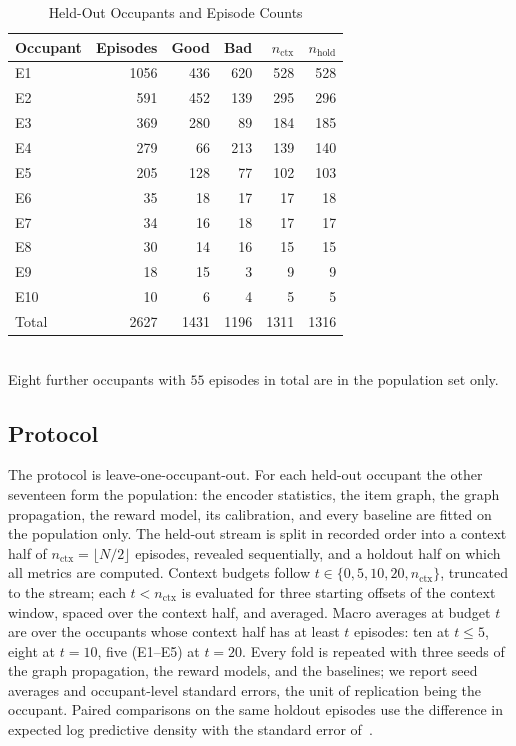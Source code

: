 \documentclass[conference]{IEEEtran}
\begin{document}
\begin{table}[t]
\caption{Held-Out Occupants and Episode Counts}
\label{tab:data}
\centering
\setlength{\tabcolsep}{5pt}
\begin{tabular}{lrrrrr}
\toprule
Occupant & Episodes & Good & Bad & $n_{\mathrm{ctx}}$ & $n_{\mathrm{hold}}$ \\
\midrule
E1  & 1056 & 436 & 620 & 528 & 528 \\
E2  &  591 & 452 & 139 & 295 & 296 \\
E3  &  369 & 280 &  89 & 184 & 185 \\
E4  &  279 &  66 & 213 & 139 & 140 \\
E5  &  205 & 128 &  77 & 102 & 103 \\
E6  &   35 &  18 &  17 &  17 &  18 \\
E7  &   34 &  16 &  18 &  17 &  17 \\
E8  &   30 &  14 &  16 &  15 &  15 \\
E9  &   18 &  15 &   3 &   9 &   9 \\
E10 &   10 &   6 &   4 &   5 &   5 \\
\midrule
Total & 2627 & 1431 & 1196 & 1311 & 1316 \\
\bottomrule
\end{tabular}
\\[2pt]
{\footnotesize Eight further occupants with $55$ episodes in total are in the population set only.}
\end{table}

\subsection{Protocol}
\label{sec:protocol}

The protocol is leave-one-occupant-out. For each held-out occupant the other seventeen form the population: the encoder statistics, the item graph, the graph propagation, the reward model, its calibration, and every baseline are fitted on the population only. The held-out stream is split in recorded order into a context half of $n_{\mathrm{ctx}}=\lfloor N/2\rfloor$ episodes, revealed sequentially, and a holdout half on which all metrics are computed. Context budgets follow $t\in\{0,5,10,20,n_{\mathrm{ctx}}\}$, truncated to the stream; each $t<n_{\mathrm{ctx}}$ is evaluated for three starting offsets of the context window, spaced over the context half, and averaged. Macro averages at budget $t$ are over the occupants whose context half has at least $t$ episodes: ten at $t\le5$, eight at $t=10$, five (E1--E5) at $t=20$. Every fold is repeated with three seeds of the graph propagation, the reward models, and the baselines; we report seed averages and occupant-level standard errors, the unit of replication being the occupant. Paired comparisons on the same holdout episodes use the difference in expected log predictive density with the standard error of~\cite{vehtari2017loo}.
\end{document}
